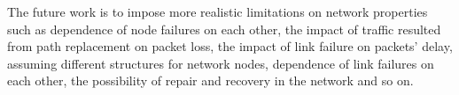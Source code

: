 \documentclass[onecolumn,conference]{IEEEtran}
\begin{document}
    The future work is to impose more realistic limitations on network properties such as dependence of node failures on each other, the impact of traffic resulted from path replacement on packet loss, the impact of link failure on packets' delay, assuming different structures for network nodes, dependence of link failures on each other, the possibility of repair and recovery in the network and so on.
\end{document}
